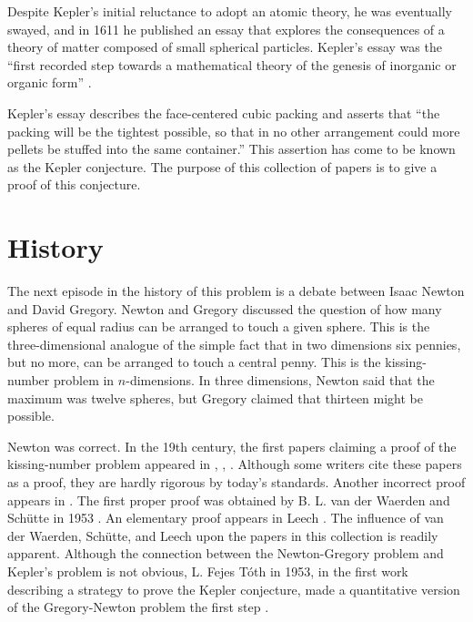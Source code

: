 \smallskip
Despite Kepler's initial reluctance to adopt an atomic theory, he
was eventually swayed, and in 1611 he published an essay that
explores the consequences of a theory of matter composed of small
spherical particles.  Kepler's essay was the ``first recorded step
towards a mathematical theory of the genesis of inorganic or
organic form'' \cite[p.v]{Why66}.

Kepler's essay describes
the face-centered cubic packing and asserts that ``the packing will
be the tightest possible, so that in no other arrangement  could more
pellets be stuffed into the same container.''  This assertion has
come to be known as the Kepler conjecture.   The purpose of this
collection of papers is to give a proof of this conjecture.

\section{History}
\label{sec:history}

The next episode in the history of this problem is a debate between
Isaac Newton and David Gregory.  Newton and Gregory discussed the
question of how many spheres of equal radius can be arranged to
touch a given sphere.  This is the three-dimensional analogue of the
simple fact that in two dimensions six pennies, but no more, can be
arranged to touch a central penny.  This is the kissing-number
problem in $n$-dimensions. In three dimensions, Newton said that the
maximum was twelve spheres, but Gregory claimed that thirteen might
be possible.

Newton was correct.
In the 19th century, the first papers claiming a proof of the
kissing-number problem appeared
in \cite{Ben74}, \cite{Gun75}, \cite{Hop74}.
Although some writers cite these papers
as a proof, they are hardly rigorous by today's standards.
Another incorrect
proof appears in \cite{Boe52}.
  The first proper proof was obtained
by B. L. van der Waerden and Sch\"utte in 1953 \cite{Sch53}.
An elementary proof appears in Leech \cite{Lee56}.
The influence of van der Waerden, Sch\"utte, and Leech upon the
papers in this collection is readily apparent.  Although the
connection between the Newton-Gregory problem and Kepler's problem
is not obvious, L. Fejes T\'oth in 1953, in the first
work describing a strategy to prove the Kepler conjecture, made
a quantitative version of the Gregory-Newton problem the first step
\cite{Fej53}.


